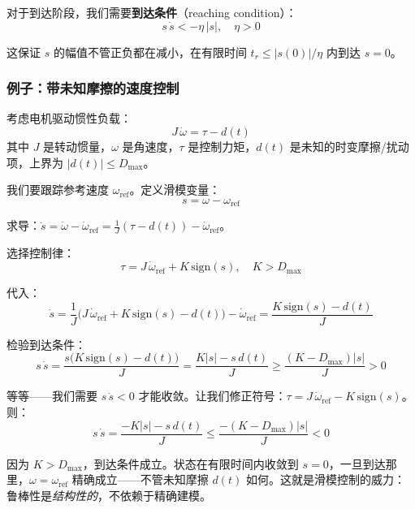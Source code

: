 对于到达阶段，我们需要\textbf{到达条件}（reaching condition）：
\begin{equation}
s\,\dot{s} < -\eta\,|s|, \quad \eta > 0
\end{equation}

这保证 $s$ 的幅值不管正负都在减小，在有限时间 $t_r \leq |s(0)|/\eta$ 内到达 $s = 0$。

\subsubsection{例子：带未知摩擦的速度控制}

考虑电机驱动惯性负载：
\begin{equation}
J\,\dot{\omega} = \tau - d(t)
\end{equation}
其中 $J$ 是转动惯量，$\omega$ 是角速度，$\tau$ 是控制力矩，$d(t)$ 是未知的时变摩擦/扰动项，上界为 $|d(t)| \leq D_{\max}$。

我们要跟踪参考速度 $\omega_{\text{ref}}$。定义滑模变量：
\begin{equation}
s = \omega - \omega_{\text{ref}}
\end{equation}

求导：$\dot{s} = \dot{\omega} - \dot{\omega}_{\text{ref}} = \frac{1}{J}(\tau - d(t)) - \dot{\omega}_{\text{ref}}$。

选择控制律：
\begin{equation}
\tau = J\,\dot{\omega}_{\text{ref}} + K\,\mathrm{sign}(s), \quad K > D_{\max}
\end{equation}

代入：
\begin{equation}
\dot{s} = \frac{1}{J}\bigl(J\,\dot{\omega}_{\text{ref}} + K\,\mathrm{sign}(s) - d(t)\bigr) - \dot{\omega}_{\text{ref}} = \frac{K\,\mathrm{sign}(s) - d(t)}{J}
\end{equation}

检验到达条件：
\begin{equation}
s\,\dot{s} = \frac{s\bigl(K\,\mathrm{sign}(s) - d(t)\bigr)}{J} = \frac{K|s| - s\,d(t)}{J} \geq \frac{(K - D_{\max})|s|}{J} > 0
\end{equation}

等等——我们需要 $s\,\dot{s} < 0$ 才能收敛。让我们修正符号：$\tau = J\,\dot{\omega}_{\text{ref}} - K\,\mathrm{sign}(s)$。则：
\begin{equation}
s\,\dot{s} = \frac{-K|s| - s\,d(t)}{J} \leq \frac{-(K - D_{\max})|s|}{J} < 0
\end{equation}

因为 $K > D_{\max}$，到达条件成立。状态在有限时间内收敛到 $s = 0$，一旦到达那里，$\omega = \omega_{\text{ref}}$ 精确成立——不管未知摩擦 $d(t)$ 如何。这就是滑模控制的威力：鲁棒性是\textit{结构性的}，不依赖于精确建模。

